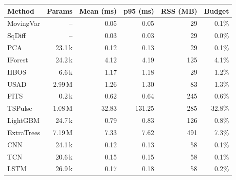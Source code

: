 \begin{tabular}{lrrrrr}
\toprule
Method & Params & Mean (ms) & p95 (ms) & RSS (MB) & Budget \\
\midrule
MovingVar & -- & 0.05 & 0.05 & 29 & 0.1\% \\
SqDiff & -- & 0.03 & 0.03 & 29 & 0.0\% \\
\midrule
PCA & 23.1\,k & 0.12 & 0.13 & 29 & 0.1\% \\
IForest & 24.2\,k & 4.12 & 4.19 & 125 & 4.1\% \\
HBOS & 6.6\,k & 1.17 & 1.18 & 29 & 1.2\% \\
USAD & 2.99\,M & 1.26 & 1.30 & 83 & 1.3\% \\
FITS & 0.2\,k & 0.62 & 0.64 & 245 & 0.6\% \\
\midrule
TSPulse & 1.08\,M & 32.83 & 131.25 & 285 & 32.8\% \\
\midrule
LightGBM & 24.7\,k & 0.79 & 0.83 & 126 & 0.8\% \\
ExtraTrees & 7.19\,M & 7.33 & 7.62 & 491 & 7.3\% \\
CNN & 24.1\,k & 0.12 & 0.13 & 58 & 0.1\% \\
TCN & 20.6\,k & 0.15 & 0.15 & 58 & 0.1\% \\
LSTM & 26.9\,k & 0.17 & 0.18 & 58 & 0.2\% \\
\bottomrule
\end{tabular}
